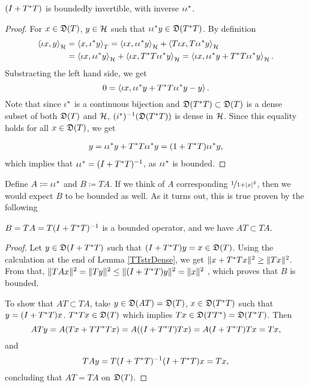 \begin{prop}
 $(I + T ^{*} T)$ is boundedly
 invertible, with inverse $\iota \iota ^{*}$.
\end{prop}
\begin{proof}
  For $x \in \mathfrak{D}(T)$, $y \in \mathcal{H}$ such that 
  $\iota  \iota ^{*} y \in \mathfrak{D}(T^{*} T)$.
  By definition 
  \begin{align*}
\left\langle \iota x, y \right\rangle_{\mathcal{H}} &= \left\langle x, \iota ^{*} y \right\rangle_T = 
  \left\langle \iota x,\iota \iota ^{*} y \right\rangle_{\mathcal{H}} +
  \left\langle  T \iota x, T \iota \iota ^{*} y \right\rangle_{\mathcal{H}} \\
  &=\left\langle \iota x, \iota \iota ^{*} y \right\rangle_{\mathcal{H}}  +
  \left\langle \iota x , T ^{*} T \iota \iota ^{*} y \right\rangle_{\mathcal{H}}  =
  \left\langle \iota x, \iota \iota ^{*} y + T^{*} T \iota \iota ^{*} y \right\rangle_{\mathcal{H}} .
  \end{align*}
    Substracting the left hand side, we get
  \[
   0 = \left\langle \iota x , \iota \iota ^{*} y + T^{*} T \iota \iota ^{*} y - y \right\rangle.
  \]
  Note that since $\iota ^{*}$ is a continuous bijection and $\mathfrak{D}(T ^{*} T)
  \subset \mathfrak{D}(T)$ is a
  dense subset of both $\mathfrak{D}(T)$ and $\mathcal{H}$, $(i ^{*}) ^{-1} (\mathfrak{D}(T ^{*} T))$ is dense
  in $\mathcal{H}$. Since this equality holds for all $x \in \mathfrak{D}(T)$, we get

  \begin{align*}
  y=\iota \iota ^{*} y + T^{*} T \iota \iota ^{*} y 
  = (1+ T ^{*} T) \iota \iota ^{*} y,
  \end{align*}
  which implies that $ \iota \iota ^{*} = ( I + T ^{*} T) ^{-1}$,
  as $\iota \iota^{*} $ is bounded.
\end{proof}

Define $A \coloneqq \iota \iota ^{*}$ and $B \coloneqq TA$. 
If we think of $A$ corresponding $\nicefrac{1}{1 + |x|^2}$, then we would expect
$B$ to be bounded as well.
As it turns out, this is true proven by the following

\begin{lem}\label{BBounded}
 $B = TA = T(I + T ^{*} T)^{-1}$ is a bounded operator, and we have
 $AT \subset TA$.
\end{lem}



\begin{proof}
 Let $y \in \mathfrak{D}(I + T ^{*} T)$ such that $(I + T ^{*} T)y = x \in \mathfrak{D}(T)$.
 Using the calculation at the end of Lemma \ref{TTstrDense}, we get 
 $\| x + T^{*} T x \|^2 \geq \|Tx\|^2$.
From that, $\| TAx\|^2 = \| Ty \| ^2 \leq \| (I + T ^{*} T)y \|^2 = \| x \| ^2$
, which proves that $B$ is bounded. 

To show that $AT \subset TA$, take $y \in \mathfrak{D}(AT) = \mathfrak{D}(T)$,
$x \in \mathfrak{D}(T ^{*} T)$ such that $y = ( I +  T ^{*} T)x$. $T ^{*} T x \in \mathfrak{D}(T)$
which implies $Tx \in \mathfrak{D}(TT^{*}) = \mathfrak{D}(T^{*} T)$. Then 
\[
 ATy = A(Tx + T T^{*} T x) = A((I + T^{*} T)Tx)= A(I+ T^{*} T)Tx= Tx,
\]
and
\[
 TAy= T(I+ T^{*} T)^{-1} (I + T ^{*} T)x=Tx,
\]
concluding that $AT = TA$ on $\mathfrak{D}(T)$.

\end{proof}

